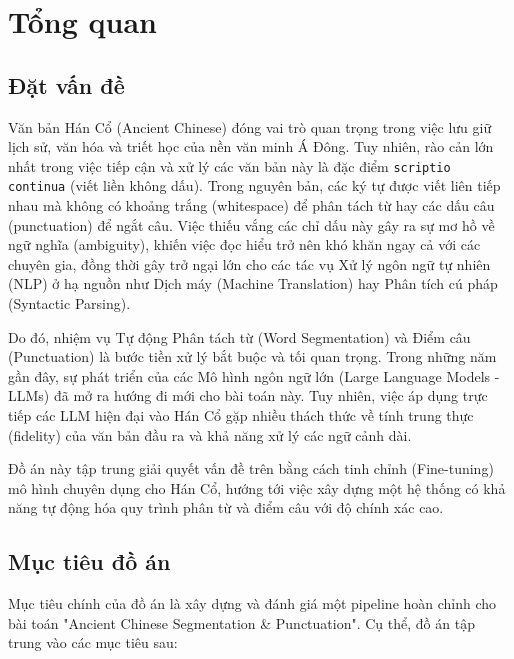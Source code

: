 \chapter{Tổng quan}
\label{chap:introduction}

\section{Đặt vấn đề}

Văn bản Hán Cổ (Ancient Chinese) đóng vai trò quan trọng trong việc lưu giữ lịch sử, văn hóa và triết học của nền văn minh Á Đông. Tuy nhiên, rào cản lớn nhất trong việc tiếp cận và xử lý các văn bản này là đặc điểm \texttt{scriptio continua} (viết liền không dấu). Trong nguyên bản, các ký tự được viết liên tiếp nhau mà không có khoảng trắng (whitespace) để phân tách từ hay các dấu câu (punctuation) để ngắt câu. Việc thiếu vắng các chỉ dấu này gây ra sự mơ hồ về ngữ nghĩa (ambiguity), khiến việc đọc hiểu trở nên khó khăn ngay cả với các chuyên gia, đồng thời gây trở ngại lớn cho các tác vụ Xử lý ngôn ngữ tự nhiên (NLP) ở hạ nguồn như Dịch máy (Machine Translation) hay Phân tích cú pháp (Syntactic Parsing).

Do đó, nhiệm vụ Tự động Phân tách từ (Word Segmentation) và Điểm câu (Punctuation) là bước tiền xử lý bắt buộc và tối quan trọng. Trong những năm gần đây, sự phát triển của các Mô hình ngôn ngữ lớn (Large Language Models - LLMs) đã mở ra hướng đi mới cho bài toán này. Tuy nhiên, việc áp dụng trực tiếp các LLM hiện đại vào Hán Cổ gặp nhiều thách thức về tính trung thực (fidelity) của văn bản đầu ra và khả năng xử lý các ngữ cảnh dài.

Đồ án này tập trung giải quyết vấn đề trên bằng cách tinh chỉnh (Fine-tuning) mô hình chuyên dụng cho Hán Cổ, hướng tới việc xây dựng một hệ thống có khả năng tự động hóa quy trình phân từ và điểm câu với độ chính xác cao.

\section{Mục tiêu đồ án}

Mục tiêu chính của đồ án là xây dựng và đánh giá một pipeline hoàn chỉnh cho bài toán "Ancient Chinese Segmentation \& Punctuation". Cụ thể, đồ án tập trung vào các mục tiêu sau:

